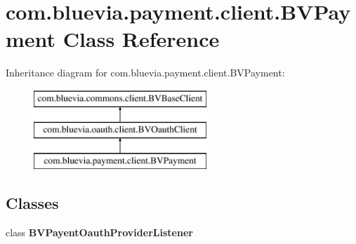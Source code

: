 \hypertarget{classcom_1_1bluevia_1_1payment_1_1client_1_1BVPayment}{
\section{com.bluevia.payment.client.BVPayment Class Reference}
\label{classcom_1_1bluevia_1_1payment_1_1client_1_1BVPayment}
}
Inheritance diagram for com.bluevia.payment.client.BVPayment:\begin{figure}[H]
\begin{center}
\leavevmode
\includegraphics[height=3.000000cm]{classcom_1_1bluevia_1_1payment_1_1client_1_1BVPayment}
\end{center}
\end{figure}
\subsection*{Classes}
\begin{DoxyCompactItemize}
\item 
class {\bfseries BVPayentOauthProviderListener}
\end{DoxyCompactItemize}
